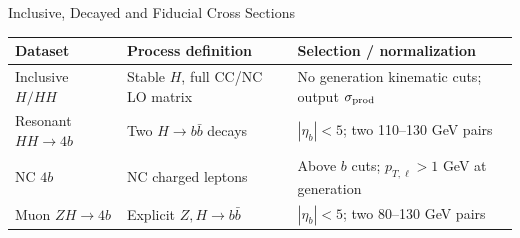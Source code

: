 \documentclass[aspectratio=1610,english]{beamer}
\newcommand{\src}[1]{\vfill{\par\color{black!65}\fontsize{6.4}{7.4}\selectfont\emph{Source:} #1\par}}
\newcommand{\key}[1]{\begin{alertblock}{Physics takeaway}\small  #1\end{alertblock}}
\begin{document}
\begin{frame}[t]{Inclusive, Decayed and Fiducial Cross Sections}
\small

\begin{center}\setlength{\tabcolsep}{5pt}
\begin{tabular}{p{2.8cm}p{4.0cm}p{4.4cm}}\toprule
Dataset & Process definition & Selection / normalization\\\midrule
Inclusive $H/HH$ & Stable $H$, full CC/NC LO matrix & No generation kinematic cuts; output $\sigma_{\rm prod}$\\
Resonant $HH\to4b$ & Two $H\to b\bar b$ decays & $|\eta_b|<5$; two 110--130 GeV pairs\\
NC $4b$ & NC charged leptons & Above $b$ cuts; $p_{T,\ell}>1$ GeV at generation\\
Muon $ZH\to4b$ & Explicit $Z,H\to b\bar b$ & $|\eta_b|<5$; two 80--130 GeV pairs\\\bottomrule
\end{tabular}\end{center}


\end{frame}
\end{document}
